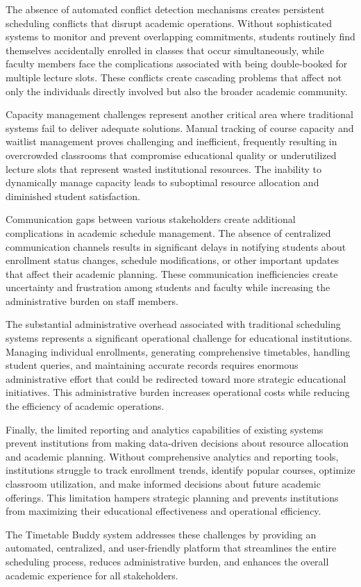 The absence of automated conflict detection mechanisms creates persistent scheduling conflicts that disrupt academic operations. Without sophisticated systems to monitor and prevent overlapping commitments, students routinely find themselves accidentally enrolled in classes that occur simultaneously, while faculty members face the complications associated with being double-booked for multiple lecture slots. These conflicts create cascading problems that affect not only the individuals directly involved but also the broader academic community.

Capacity management challenges represent another critical area where traditional systems fail to deliver adequate solutions. Manual tracking of course capacity and waitlist management proves challenging and inefficient, frequently resulting in overcrowded classrooms that compromise educational quality or underutilized lecture slots that represent wasted institutional resources. The inability to dynamically manage capacity leads to suboptimal resource allocation and diminished student satisfaction.

Communication gaps between various stakeholders create additional complications in academic schedule management. The absence of centralized communication channels results in significant delays in notifying students about enrollment status changes, schedule modifications, or other important updates that affect their academic planning. These communication inefficiencies create uncertainty and frustration among students and faculty while increasing the administrative burden on staff members.

The substantial administrative overhead associated with traditional scheduling systems represents a significant operational challenge for educational institutions. Managing individual enrollments, generating comprehensive timetables, handling student queries, and maintaining accurate records requires enormous administrative effort that could be redirected toward more strategic educational initiatives. This administrative burden increases operational costs while reducing the efficiency of academic operations.

Finally, the limited reporting and analytics capabilities of existing systems prevent institutions from making data-driven decisions about resource allocation and academic planning. Without comprehensive analytics and reporting tools, institutions struggle to track enrollment trends, identify popular courses, optimize classroom utilization, and make informed decisions about future academic offerings. This limitation hampers strategic planning and prevents institutions from maximizing their educational effectiveness and operational efficiency.

The Timetable Buddy system addresses these challenges by providing an automated, centralized, and user-friendly platform that streamlines the entire scheduling process, reduces administrative burden, and enhances the overall academic experience for all stakeholders.
